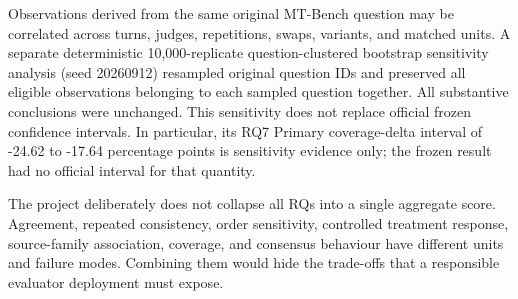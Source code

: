 Observations derived from the same original MT-Bench question may be correlated across turns, judges, repetitions, swaps, variants, and matched units. A separate deterministic 10,000-replicate question-clustered bootstrap sensitivity analysis (seed 20260912) resampled original question IDs and preserved all eligible observations belonging to each sampled question together. All substantive conclusions were unchanged. This sensitivity does not replace official frozen confidence intervals. In particular, its RQ7 Primary coverage-delta interval of -24.62 to -17.64 percentage points is sensitivity evidence only; the frozen result had no official interval for that quantity.

The project deliberately does not collapse all RQs into a single aggregate score. Agreement, repeated consistency, order sensitivity, controlled treatment response, source-family association, coverage, and consensus behaviour have different units and failure modes. Combining them would hide the trade-offs that a responsible evaluator deployment must expose.
